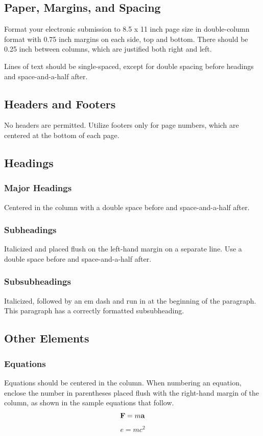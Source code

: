 \documentclass[twocolumn,letterpaper]{IEEEAerospaceCLS}  %
\begin{document}
\subsection{Paper, Margins, and Spacing}
Format your electronic submission to 8.5 x 11 inch page size in double-column format with 0.75 inch margins on each side, top and bottom. There should be 0.25 inch between columns, which are justified both right and left.

Lines of text should be single-spaced, except for double spacing before headings and space-and-a-half after.

\subsection{Headers and Footers}
No headers are permitted. Utilize footers only for page numbers, which are centered at the bottom of each page.

\subsection{Headings}
\subsubsection{Major Headings}
Centered in the column with a double space before and space-and-a-half after.
\subsubsection{Subheadings}
Italicized and placed flush on the left-hand margin on a separate line. Use a double space before and space-and-a-half after.
\subsubsection{Subsubheadings}
Italicized, followed by an em dash and run in at the beginning of the paragraph. This paragraph has a correctly formatted subsubheading.

\subsection{Other Elements}
\subsubsection{Equations}
Equations should be centered in the column. When numbering an equation, enclose the number in parentheses placed flush with the right-hand margin of the column, as shown in the sample equations that follow.
\begin{equation}
{\bf F}=m{\bf a}
\end{equation}
\begin{equation}
e=mc^2
\end{equation}
\end{document}
